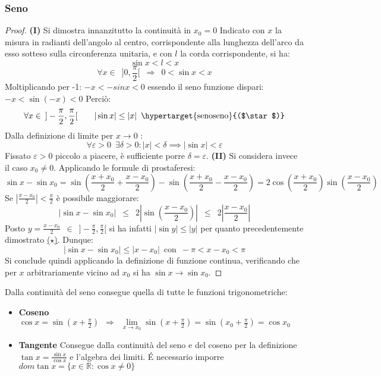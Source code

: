 \documentclass[10pt, oneside]{book}
\theoremstyle{plain}
\begin{document}
\subsubsection{Seno}
\begin{proof}
\textbf{(I)} Si dimostra innanzitutto la continuità in $x_0 = 0$ \newline 
Indicato con $x$ la misura in radianti dell'angolo al centro, corrispondente alla lunghezza dell'arco da esso sotteso sulla circonferenza unitaria, e con $l$ la corda corrispondente, si ha:
\[\sin x < l < x\]
\[\forall x \in \enspace ]0,\frac{\pi}{2}[ \enspace \Longrightarrow \enspace 0 < \sin x < x\]
Moltiplicando per -1: $-x < -sinx < 0$ essendo il seno funzione dispari: $-x < \sin (-x) < 0$ Perciò:
\[\forall x \in \enspace ]-\frac{\pi}{2}, \frac{\pi}{2}[ \quad \quad |\sin x| \leq |x| \enspace \textrm{\hypertarget{senoseno}{($\star$)}} \]
Dalla definizione di limite per $x \longrightarrow 0$ :
\[\forall \varepsilon >0 \enspace \exists \delta > 0 : |x| < \delta \implies |\sin x| < \varepsilon\]
Fissato $\varepsilon > 0$ piccolo a piacere, è sufficiente porre $\delta = \varepsilon$. \newline
\textbf{(II)} Si considera invece il caso $x_0 \neq 0$. Applicando le formule di prostaferesi:
\[\sin x - \sin x_0 = \sin (\frac{x + x_0}{2} + \frac{x - x_0}{2}) - \sin (\frac{x + x_0}{2} - \frac{x - x_0}{2}) = 2 \cos (\frac{x + x_0}{2}) \sin (\frac{x - x_0}{2})\]
Se $\displaystyle |\frac{x - x_0}{2}| < \frac{\pi}{2}$ è possibile maggiorare:
\[|\sin x - \sin x_0| \enspace \leq \enspace 2 |\sin (\frac{x - x_0}{2})| \enspace \leq \enspace 2|\frac{x - x_0}{2}|\]
Posto $\displaystyle y = \frac{x - x_0}{2} \enspace \in \enspace ]-\frac{\pi}{2}, \frac{\pi}{2}[$ si ha infatti $|\sin y| \leq |y|$ per quanto precedentemente dimostrato \hyperlink{senoseno}{($\star$)}. Dunque:
\[|\sin x - \sin x_0| \leq |x - x_0| \enspace \textrm{con} \enspace -\pi < x - x_0 < \pi\]
Si conclude quindi applicando la definizione di funzione continua, verificando che per $x$ arbitrariamente vicino ad $x_0$ si ha $\sin x \longrightarrow \sin x_0$.
\end{proof}
Dalla continuità del seno consegue quella di tutte le funzioni trigonometriche:
\begin{itemize}[label=$\ast$]
\item \textbf{Coseno} $\cos x = \sin (x + \frac{\pi}{2}) \enspace \Rightarrow \enspace \lim \limits_{x \rightarrow x_0} \sin (x + \frac{\pi}{2}) = \sin (x_0 + \frac{\pi}{2}) = \cos x_0$
\item \textbf{Tangente} Consegue dalla continuità del seno e del coseno per la definizione $\tan x = \frac{\sin x}{\cos x}$ e l'algebra dei limiti. \'E necessario imporre $dom \tan x = \{x \in \mathbb{R} : \cos x \neq 0\}$
\end{itemize}
\end{document}

